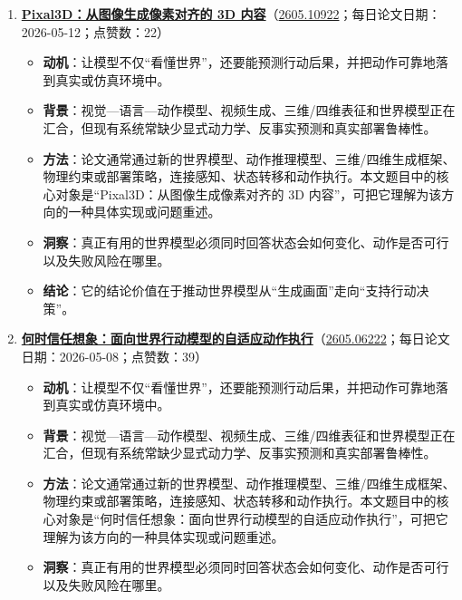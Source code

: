 \begin{enumerate}[leftmargin=1.5em]
\begin{itemize}[leftmargin=1.5em]
    \item \textbf{洞察}：真正有用的世界模型必须同时回答状态会如何变化、动作是否可行以及失败风险在哪里。
    \item \textbf{结论}：它的结论价值在于推动世界模型从“生成画面”走向“支持行动决策”。
  \end{itemize}
  \item \textbf{\href{https://huggingface.co/papers/2605.10922}{Pixal3D：从图像生成像素对齐的 3D 内容}}（\href{https://arxiv.org/abs/2605.10922}{2605.10922}；每日论文日期：2026-05-12；点赞数：22）
  \begin{itemize}[leftmargin=1.5em]
    \item \textbf{动机}：让模型不仅“看懂世界”，还要能预测行动后果，并把动作可靠地落到真实或仿真环境中。
    \item \textbf{背景}：视觉—语言—动作模型、视频生成、三维/四维表征和世界模型正在汇合，但现有系统常缺少显式动力学、反事实预测和真实部署鲁棒性。
    \item \textbf{方法}：论文通常通过新的世界模型、动作推理模型、三维/四维生成框架、物理约束或部署策略，连接感知、状态转移和动作执行。本文题目中的核心对象是“Pixal3D：从图像生成像素对齐的 3D 内容”，可把它理解为该方向的一种具体实现或问题重述。
    \item \textbf{洞察}：真正有用的世界模型必须同时回答状态会如何变化、动作是否可行以及失败风险在哪里。
    \item \textbf{结论}：它的结论价值在于推动世界模型从“生成画面”走向“支持行动决策”。
  \end{itemize}
  \item \textbf{\href{https://huggingface.co/papers/2605.06222}{何时信任想象：面向世界行动模型的自适应动作执行}}（\href{https://arxiv.org/abs/2605.06222}{2605.06222}；每日论文日期：2026-05-08；点赞数：39）
  \begin{itemize}[leftmargin=1.5em]
    \item \textbf{动机}：让模型不仅“看懂世界”，还要能预测行动后果，并把动作可靠地落到真实或仿真环境中。
    \item \textbf{背景}：视觉—语言—动作模型、视频生成、三维/四维表征和世界模型正在汇合，但现有系统常缺少显式动力学、反事实预测和真实部署鲁棒性。
    \item \textbf{方法}：论文通常通过新的世界模型、动作推理模型、三维/四维生成框架、物理约束或部署策略，连接感知、状态转移和动作执行。本文题目中的核心对象是“何时信任想象：面向世界行动模型的自适应动作执行”，可把它理解为该方向的一种具体实现或问题重述。
    \item \textbf{洞察}：真正有用的世界模型必须同时回答状态会如何变化、动作是否可行以及失败风险在哪里。

\end{itemize}
\end{enumerate}
